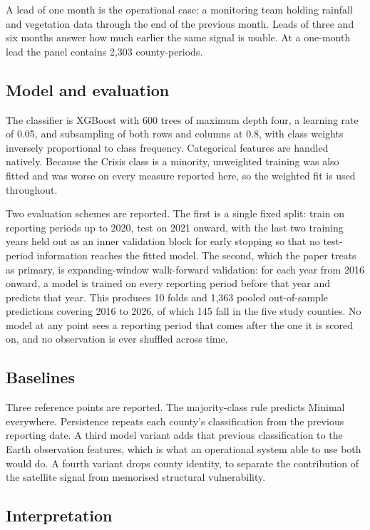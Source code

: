 \documentclass[11pt]{article}
\begin{document}
A lead of one month is the operational case: a monitoring team holding rainfall
and vegetation data through the end of the previous month. Leads of three and
six months answer how much earlier the same signal is usable. At a one-month
lead the panel contains 2,303 county-periods.

\subsection{Model and evaluation}

The classifier is XGBoost \cite{chen2016} with 600 trees of maximum depth four,
a learning rate of 0.05, and subsampling of both rows and columns at 0.8, with
class weights inversely proportional to class frequency. Categorical features
are handled natively. Because the Crisis class is a minority, unweighted
training was also fitted and was worse on every measure reported here, so the
weighted fit is used throughout.

Two evaluation schemes are reported. The first is a single fixed split: train on
reporting periods up to 2020, test on 2021 onward, with the last two training
years held out as an inner validation block for early stopping so that no
test-period information reaches the fitted model. The second, which the paper
treats as primary, is expanding-window walk-forward validation: for each year
from 2016 onward, a model is trained on every reporting period before that year
and predicts that year. This produces 10 folds and 1,363 pooled out-of-sample
predictions covering 2016 to 2026, of which 145 fall in the five study counties.
No model at any point sees a reporting period that comes after the one it is
scored on, and no observation is ever shuffled across time.

\subsection{Baselines}

Three reference points are reported. The majority-class rule predicts Minimal
everywhere. Persistence repeats each county's classification from the previous
reporting date. A third model variant adds that previous classification to the
Earth observation features, which is what an operational system able to use both
would do. A fourth variant drops county identity, to separate the contribution of
the satellite signal from memorised structural vulnerability.

\subsection{Interpretation}
\end{document}
